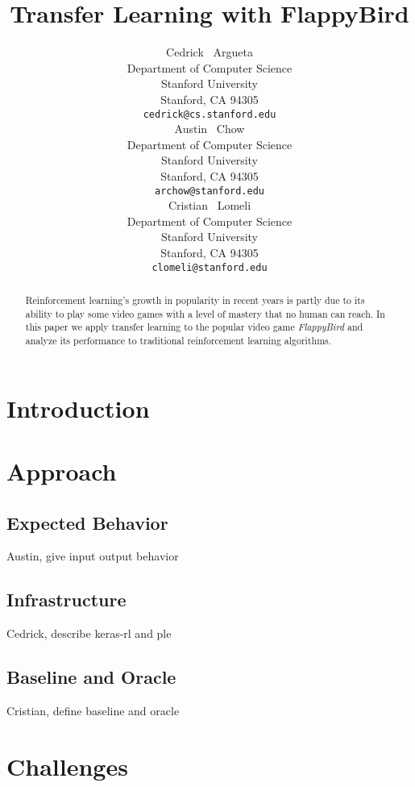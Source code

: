 \documentclass{article}
\title{Transfer Learning with FlappyBird}
\author{
  Cedrick ~Argueta \\%
  Department of Computer Science\\
  Stanford University\\
  Stanford, CA 94305 \\
  \texttt{cedrick@cs.stanford.edu} \\
  \And
  Austin ~Chow \\
  Department of Computer Science \\
  Stanford University\\
  Stanford, CA 94305 \\
  \texttt{archow@stanford.edu} \\
  \AND
  Cristian ~Lomeli\\
  Department of Computer Science \\
  Stanford University\\
  Stanford, CA 94305 \\
  \texttt{clomeli@stanford.edu} \\
}
\begin{document}

\maketitle

\begin{abstract}

Reinforcement learning's growth in popularity in recent years is partly due to its ability to play some video games with a level of mastery that no human can reach. In this paper we apply transfer learning to the popular video game \textit{FlappyBird} and analyze its performance to traditional reinforcement learning algorithms.
 
\end{abstract}

\section{Introduction}

\section{Approach}

\subsection{Expected Behavior}

Austin, give input output behavior

\subsection{Infrastructure}

Cedrick, describe keras-rl and ple

\subsection{Baseline and Oracle}

Cristian, define baseline and oracle

\section{Challenges}
\end{document}
